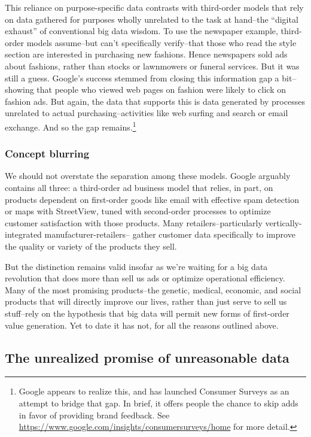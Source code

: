 \documentclass[12pt]{article}
\begin{document}
This reliance on purpose-specific data contrasts with third-order
models that rely on data gathered for purposes wholly unrelated to the
task at hand--the ``digital exhaust'' of conventional big data
wisdom. To use the newspaper example, third-order models assume--but
can't specifically verify--that those who read the style section are
interested in purchasing new fashions. Hence newspapers sold ads about
fashions, rather than stocks or lawnmowers or funeral services. But it
was still a guess. Google's success stemmed from closing this
information gap a bit--showing that people who viewed web pages on
fashion were likely to click on fashion ads. But
again, the data that supports this is data generated by processes
unrelated to actual purchasing--activities like web surfing and search
or email exchange. And so the gap remains.\footnote{Google appears to
  realize this, and has launched Consumer Surveys as an attempt to
  bridge that gap. In brief, it offers people the chance to skip adds
  in favor of providing brand feedback. See
  \url{https://www.google.com/insights/consumersurveys/home} for more detail.}


\subsubsection{Concept blurring}
\label{sec:concept-blurring}

We should not overstate the separation among these models. Google
arguably contains all three: a third-order ad business model that
relies, in part, on products dependent on first-order goods like email
with effective spam detection or maps with StreetView, tuned with
second-order processes to optimize customer satisfaction with those
products. Many retailers--particularly vertically-integrated
manufacturer-retailers-- gather customer data specifically to improve
the quality or variety of the products they sell.

But the distinction remains valid insofar as we're waiting for a big
data revolution that does more than sell us ads or optimize
operational efficiency. Many of the most promising products--the
genetic, medical, economic, and social products that will directly
improve our lives, rather than just serve to sell us stuff--rely on
the hypothesis that big data will permit new forms of first-order
value generation. Yet to date it has not, for all the reasons outlined
above. 

\subsection{The unrealized promise of unreasonable data}
\label{sec:unre-prom-unre}
\end{document}

